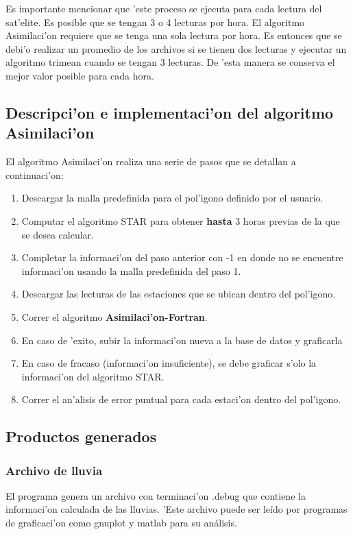 Es importante mencionar que 'este proceso se ejecuta para cada lectura del sat'elite. Es posible que se tengan 3 o 4 lecturas por hora. El algoritmo 
Asimilaci'on requiere que se tenga una sola lectura por hora. Es entonces que se debi'o realizar un promedio de los archivos si se tienen dos lecturas y 
ejecutar un algoritmo trimean cuando se tengan 3 lecturas. De 'esta manera se conserva el mejor valor posible para cada hora.

\subsection{Descripci'on e implementaci'on del algoritmo Asimilaci'on}
El algoritmo Asimilaci'on realiza una serie de pasos que se detallan a continuaci'on:
\begin{enumerate}
 \item Descargar la malla predefinida para el pol'igono definido por el usuario.
  \item Computar el algoritmo STAR para obtener \textbf{hasta} 3 horas previas de la que se desea calcular.
  \item Completar la informaci'on del paso anterior con -1 en donde no se encuentre informaci'on usando la malla predefinida del paso 1.
  \item Descargar las lecturas de las estaciones que se ubican dentro del pol'igono.
  \item Correr el algoritmo \textbf{Asimilaci'on-Fortran}.
  \item En caso de 'exito, subir la informaci'on nueva a la base de datos y graficarla
  \item En caso de fracaso (informaci'on insuficiente), se debe graficar s'olo la informaci'on del algoritmo STAR.
  \item Correr el an'alisis de error puntual para cada estaci'on dentro del pol'igono.
\end{enumerate}

\subsection{Productos generados}
\subsubsection*{Archivo de lluvia}
El programa genera un archivo con terminaci'on .debug que contiene la informaci'on calculada de las lluvias.
'Este archivo puede ser leído por programas de graficaci'on como gnuplot y matlab para su análisis.

